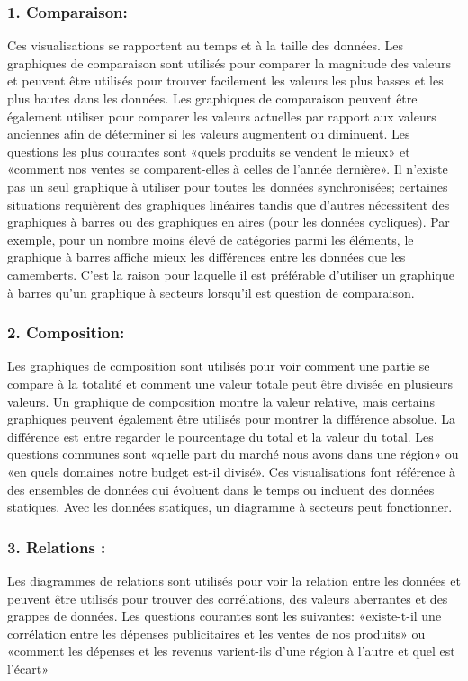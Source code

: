 \documentclass[french, a4paper, 12pt]{report}
\begin{document}
\subsubsection{1. Comparaison: }
Ces visualisations se rapportent au temps et à la taille des données. Les graphiques de comparaison sont utilisés pour comparer la magnitude des valeurs et peuvent être utilisés pour trouver facilement les valeurs les plus basses et les plus hautes dans les données. Les graphiques de comparaison peuvent être également utiliser pour comparer les valeurs actuelles par rapport aux valeurs anciennes afin de déterminer si les valeurs augmentent ou diminuent. Les questions les plus courantes sont «quels produits se vendent le mieux» et «comment nos ventes se comparent-elles à celles de l'année dernière».
Il n’existe pas un seul graphique à utiliser pour toutes les données synchronisées; certaines situations requièrent des graphiques linéaires tandis que d'autres nécessitent des graphiques à barres ou des graphiques en aires (pour les données cycliques).
Par exemple, pour un nombre moins élevé de catégories parmi les éléments, le  graphique à barres affiche mieux les différences entre les données que les camemberts. C’est la raison pour laquelle il est préférable d’utiliser un graphique à barres qu’un graphique à secteurs lorsqu'il est question de comparaison.
\subsubsection{2. Composition:}
Les graphiques de composition sont utilisés pour voir comment une partie se compare à la totalité et comment une valeur totale peut être divisée en plusieurs valeurs. Un graphique de composition montre la valeur relative, mais certains graphiques peuvent également être utilisés pour montrer la différence absolue. La différence est entre regarder le pourcentage du total et la valeur du total. Les questions communes sont «quelle part du marché nous avons dans une région» ou «en quels domaines notre budget est-il divisé».
Ces visualisations font référence à des ensembles de données qui évoluent dans le temps ou incluent des données statiques. Avec les données statiques, un diagramme à secteurs peut fonctionner.
\subsubsection{3. Relations : }
Les diagrammes de relations sont utilisés pour voir la relation entre les données et peuvent être utilisés pour trouver des corrélations, des valeurs aberrantes et des grappes de données. Les questions courantes sont les suivantes: «existe-t-il une corrélation entre les dépenses publicitaires et les ventes de nos produits» ou «comment les dépenses et les revenus varient-ils d’une région à l’autre et quel est l’écart»
\end{document}
